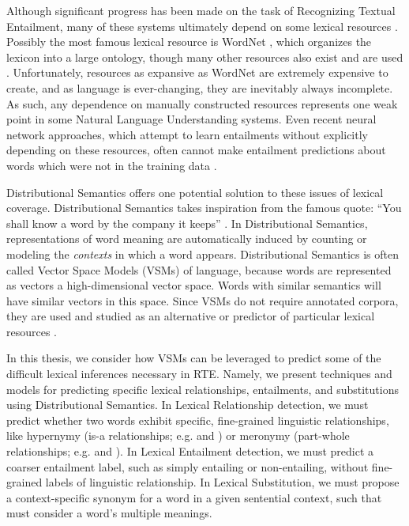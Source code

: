 Although significant progress has been made on the task of Recognizing Textual
Entailment, many of these systems ultimately depend on some lexical resources
\cite{beltagy:2014:semeval,bjerva:2014:semeval,lai:2014:semeval,marelli:2014:semeval,beltagy:2016:cl}.
Possibly the most famous lexical resource is WordNet \cite{miller:1995:acm},
which organizes the lexicon into a large ontology,
though many other resources also exist and are used
\cite{baker:1998:acl,baroni:2011:gems,baroni:2012:eacl,ganitkevitch:2013:naacl,jurgens:2012:semeval,levy:2014:conll,turney:2015:nle}.
Unfortunately, resources as expansive as WordNet are extremely expensive
to create, and as language is ever-changing, they are inevitably
always incomplete. As such, any dependence on manually constructed resources
represents one weak point in some Natural Language Understanding systems. Even
recent neural network approaches, which attempt to learn entailments without
explicitly depending on these resources, often cannot make entailment
predictions about words which were not in the training data
\cite{bowman:2015:emnlp,cheng:2016:emnlp,pavlick:2016:acl}.

Distributional Semantics offers one potential solution to these issues of lexical
coverage. Distributional Semantics takes inspiration from the famous quote:
``You shall know a word by the company it keeps'' \cite{firth:1957:la}. In
Distributional Semantics, representations of word meaning are automatically
induced by counting or modeling the {\em contexts} in which a word appears.
Distributional Semantics is often called Vector Space Models (VSMs) of
language, because words are represented as vectors a high-dimensional vector space.
Words with similar semantics will have similar vectors in this
space. Since VSMs do not require annotated corpora, they are used and
studied as an alternative or predictor of particular lexical resources
\cite{baroni:2012:eacl,erk:2008:emnlp,turney:2010:jair}.

In this thesis, we consider how VSMs can be leveraged to predict some of the
difficult lexical inferences necessary in RTE.  Namely, we present techniques
and models for predicting specific lexical relationships, entailments, and
substitutions using Distributional Semantics. In Lexical Relationship
detection, we must predict whether two words exhibit specific, fine-grained
linguistic relationships, like hypernymy (is-a relationships; e.g. 
and ) or meronymy (part-whole relationships; e.g.  and
). In Lexical Entailment detection, we must predict a coarser
entailment label, such as simply entailing or non-entailing, without
fine-grained labels of linguistic relationship. In Lexical Substitution, we
must propose a context-specific synonym for a word in a given sentential
context, such that must consider a word's multiple meanings. 

